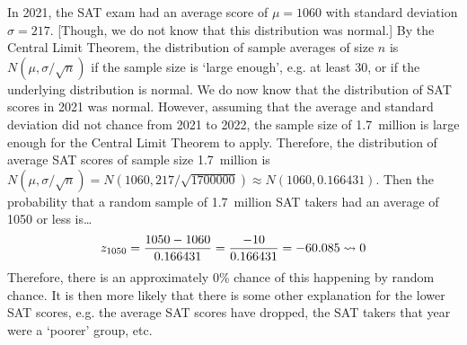 \documentclass[11pt,letterpaper]{article}
\begin{document}
\sol In 2021, the SAT exam had an average score of $\mu= 1060$ with standard deviation $\sigma= 217$. [Though, we do not know that this distribution was normal.] By the Central Limit Theorem, the distribution of sample averages of size $n$ is $N(\mu, \sigma/\sqrt{n})$ if the sample size is `large enough', e.g. at least 30, or if the underlying distribution is normal. We do now know that the distribution of SAT scores in 2021 was normal. However, assuming that the average and standard deviation did not chance from 2021 to 2022, the sample size of 1.7~million is large enough for the Central Limit Theorem to apply. Therefore, the distribution of average SAT scores of sample size 1.7~million is $N(\mu, \sigma/\sqrt{n})= N(1060, 217/\sqrt{1700000}) \approx N(1060, 0.166431)$. Then the probability that a random sample of 1.7~million SAT takers had an average of 1050 or less is\dots
	\[
	z_{1050}= \dfrac{1050 - 1060}{0.166431}= \dfrac{-10}{0.166431}= -60.085 \rightsquigarrow 0
	\]
Therefore, there is an approximately 0\% chance of this happening by random chance. It is then more likely that there is some other explanation for the lower SAT scores, e.g. the average SAT scores have dropped, the SAT takers that year were a `poorer' group, etc. 
\end{document}
